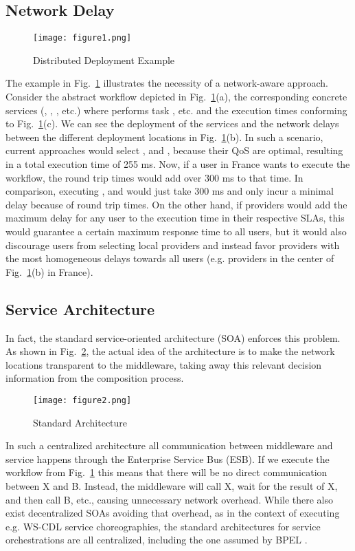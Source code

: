 \documentclass[10pt, conference, compsocconf]{IEEEtran}
\newcommand{\oneImage}{3.2in}
\newcommand{\twoImages}{1.6in}
\begin{document}
\subsection{Network Delay}
\begin{figure}[htb!]
	\centering
	\texttt{[image: figure1.png]}
	\caption{Distributed Deployment Example}
	\label{fig:example1}
\end{figure}

\noindent The example in Fig.~\ref{fig:example1} illustrates the necessity of a network-aware approach.
Consider the abstract workflow depicted in Fig.~\ref{fig:example1}(a),
	the corresponding concrete services (, , , etc.) where  performs task , etc.
		and the execution times conforming to Fig.~\ref{fig:example1}(c).
We can see the deployment of the services and the network delays between the different deployment locations in Fig.~\ref{fig:example1}(b).
In such a scenario, current approaches would select ,  and ,
	because their QoS are optimal, resulting in a total execution time of 255 ms.
Now, if a user in France wants to execute the workflow,
	the round trip times would add over 300 ms to that time.
In comparison, executing ,  and  would just take 300 ms
	and only incur a minimal delay because of round trip times.
On the other hand, if providers would add the maximum delay for any user to the execution time in their respective SLAs,
	this would guarantee a certain maximum response time to all users,
		but it would also discourage users from selecting local providers
			and instead favor providers with the most homogeneous delays towards all users
				(e.g. providers in the center of Fig.~\ref{fig:example1}(b) in France).

\subsection{Service Architecture}
\noindent In fact, the standard service-oriented architecture (SOA) enforces this problem.
As shown in Fig.~\ref{fig:architecture}, 
	the actual idea of the architecture is to make the network locations transparent to the middleware,
		taking away this relevant decision information from the composition process.

\begin{figure}[htb!]
	\centering
	\texttt{[image: figure2.png]}
	\caption{Standard Architecture}
	\label{fig:architecture}
\end{figure}

\noindent In such a centralized architecture \cite{Papazoglou2003} all communication between middleware and service happens through the Enterprise Service Bus (ESB).
If we execute the workflow from Fig.~\ref{fig:example1} this means that there will be no direct communication between X and B.
Instead, the middleware will call X, wait for the result of X, and then call B, etc.,
	causing unnecessary network overhead.
While there also exist decentralized SOAs avoiding that overhead, as in the context of executing e.g. WS-CDL \cite{WS-CDL2005} service choreographies,
	the standard architectures for service orchestrations are all centralized, including the one assumed by BPEL \cite{BPEL2006}.
\end{document}
